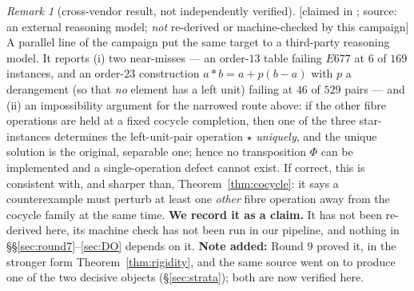 \documentclass[11pt]{article}
\theoremstyle{plain}
\theoremstyle{definition}
\theoremstyle{remark}
\newtheorem*{remark*}{Remark}
\numberwithin{equation}{section}
\newcommand{\op}{\mathbin{*}}
\newcommand{\statusbox}[1]{{\small\sloppy\textsf{[#1]}}}
\begin{document}
\begin{remark*}[cross-vendor result, not independently verified]
\statusbox{claimed in \cite{R6gpt}; source: an external reasoning model; \emph{not}
re-derived or machine-checked by this campaign}
A parallel line of the campaign put the same target to a third-party reasoning
model. It reports (i) two near-misses --- an order-$13$ table failing $E677$ at
$6$ of $169$ instances, and an order-$23$ construction
$a\op b = a+p(b-a)$ with $p$ a derangement (so that \emph{no} element has a left
unit) failing at $46$ of $529$ pairs --- and (ii) an impossibility argument for
the narrowed route above: if the other fibre operations are held at a fixed
cocycle completion, then one of the three star-instances determines the
left-unit-pair operation $\star$ \emph{uniquely}, and the unique solution is the
original, separable one; hence no transposition $\Phi$ can be implemented and a
single-operation defect cannot exist. If correct, this is consistent with, and
sharper than, Theorem~\ref{thm:cocycle}: it says a counterexample must perturb at
least one \emph{other} fibre operation away from the cocycle family at the same
time. \textbf{We record it as a claim.} It has not been re-derived here, its
machine check has not been run in our pipeline, and nothing in
\S\S\ref{sec:round7}--\ref{sec:DO} depends on it.
\textbf{Note added:} Round 9 proved it, in the stronger form
Theorem~\ref{thm:rigidity}, and the same source went on to produce one of the two
decisive objects (\S\ref{sec:strata}); both are now verified here.
\end{remark*}
\end{document}
